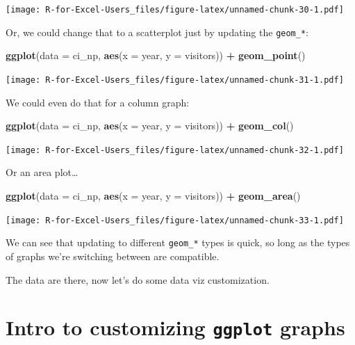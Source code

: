 \documentclass[]{book}
\newenvironment{Shaded}{\begin{snugshade}}{\end{snugshade}}
\newcommand{\DataTypeTok}[1]{\textcolor[rgb]{0.13,0.29,0.53}{#1}}
\newcommand{\KeywordTok}[1]{\textcolor[rgb]{0.13,0.29,0.53}{\textbf{#1}}}
\newcommand{\NormalTok}[1]{#1}
\newcommand{\OperatorTok}[1]{\textcolor[rgb]{0.81,0.36,0.00}{\textbf{#1}}}
\newcommand{\StringTok}[1]{\textcolor[rgb]{0.31,0.60,0.02}{#1}}
\begin{document}
\texttt{[image: R-for-Excel-Users\_files/figure-latex/unnamed-chunk-30-1.pdf]}

Or, we could change that to a scatterplot just by updating the \texttt{geom\_*}:

\begin{Shaded}
\begin{Highlighting}[]
\KeywordTok{ggplot}\NormalTok{(}\DataTypeTok{data =}\NormalTok{ ci_np, }\KeywordTok{aes}\NormalTok{(}\DataTypeTok{x =}\NormalTok{ year, }\DataTypeTok{y =}\NormalTok{ visitors)) }\OperatorTok{+}
\StringTok{  }\KeywordTok{geom_point}\NormalTok{()}
\end{Highlighting}
\end{Shaded}

\texttt{[image: R-for-Excel-Users\_files/figure-latex/unnamed-chunk-31-1.pdf]}

We could even do that for a column graph:

\begin{Shaded}
\begin{Highlighting}[]
\KeywordTok{ggplot}\NormalTok{(}\DataTypeTok{data =}\NormalTok{ ci_np, }\KeywordTok{aes}\NormalTok{(}\DataTypeTok{x =}\NormalTok{ year, }\DataTypeTok{y =}\NormalTok{ visitors)) }\OperatorTok{+}
\StringTok{  }\KeywordTok{geom_col}\NormalTok{()}
\end{Highlighting}
\end{Shaded}

\texttt{[image: R-for-Excel-Users\_files/figure-latex/unnamed-chunk-32-1.pdf]}

Or an area plot\ldots{}

\begin{Shaded}
\begin{Highlighting}[]
\KeywordTok{ggplot}\NormalTok{(}\DataTypeTok{data =}\NormalTok{ ci_np, }\KeywordTok{aes}\NormalTok{(}\DataTypeTok{x =}\NormalTok{ year, }\DataTypeTok{y =}\NormalTok{ visitors)) }\OperatorTok{+}
\StringTok{  }\KeywordTok{geom_area}\NormalTok{()}
\end{Highlighting}
\end{Shaded}

\texttt{[image: R-for-Excel-Users\_files/figure-latex/unnamed-chunk-33-1.pdf]}

We can see that updating to different \texttt{geom\_*} types is quick, so long as the types of graphs we're switching between are compatible.

The data are there, now let's do some data viz customization.

\hypertarget{intro-to-customizing-ggplot-graphs}{%
\section{\texorpdfstring{Intro to customizing \texttt{ggplot} graphs}{Intro to customizing ggplot graphs}}\label{intro-to-customizing-ggplot-graphs}}
\end{document}
